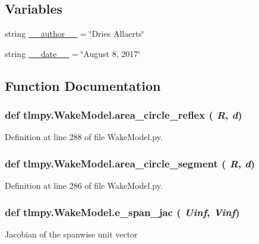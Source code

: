 \subsection*{Variables}
\begin{DoxyCompactItemize}
\item 
string \hyperlink{namespacetlmpy_1_1WakeModel_ae93b45c36a0ac1bdcfd7431dda66338a}{\_\-\_\-author\_\-\_\-} = \char`\"{}Dries Allaerts\char`\"{}
\item 
string \hyperlink{namespacetlmpy_1_1WakeModel_ad359221c128f60c6919ae9839ddb0dff}{\_\-\_\-date\_\-\_\-} = \char`\"{}August 8, 2017\char`\"{}
\end{DoxyCompactItemize}


\subsection{Function Documentation}
\hypertarget{namespacetlmpy_1_1WakeModel_ad9569b5fb894fc9640e4916b1ae8216c}{
\subsubsection[{area\_\-circle\_\-reflex}]{\setlength{\rightskip}{0pt plus 5cm}def tlmpy.WakeModel.area\_\-circle\_\-reflex ( {\em R}, \/   {\em d})}}
\label{namespacetlmpy_1_1WakeModel_ad9569b5fb894fc9640e4916b1ae8216c}


Definition at line 288 of file WakeModel.py.\hypertarget{namespacetlmpy_1_1WakeModel_a8167fb8ed0bf948b133eecc36b8c3d19}{
\subsubsection[{area\_\-circle\_\-segment}]{\setlength{\rightskip}{0pt plus 5cm}def tlmpy.WakeModel.area\_\-circle\_\-segment ( {\em R}, \/   {\em d})}}
\label{namespacetlmpy_1_1WakeModel_a8167fb8ed0bf948b133eecc36b8c3d19}


Definition at line 286 of file WakeModel.py.\hypertarget{namespacetlmpy_1_1WakeModel_a868387cb653848d640fa99ff825132b9}{
\subsubsection[{e\_\-span\_\-jac}]{\setlength{\rightskip}{0pt plus 5cm}def tlmpy.WakeModel.e\_\-span\_\-jac ( {\em Uinf}, \/   {\em Vinf})}}
\label{namespacetlmpy_1_1WakeModel_a868387cb653848d640fa99ff825132b9}
\begin{DoxyVerb}Jacobian of the spanwise unit vector\end{DoxyVerb}
 

